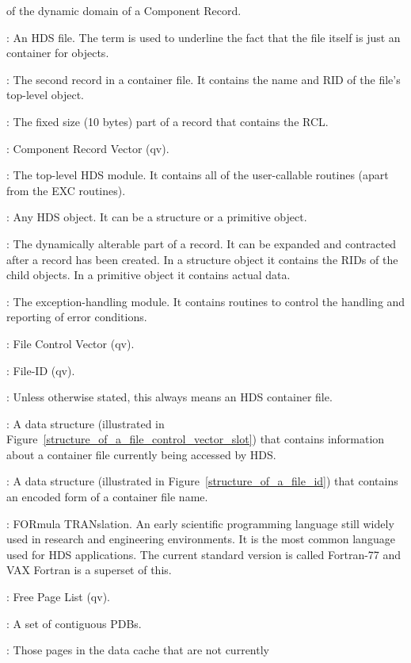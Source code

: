 \begin {description}
of the dynamic domain of a Component Record.
\item [Container File]: An HDS file. The term is used to underline the fact
that the file itself is just an container for objects.
\item [Container Record]: The second record in a container file. It contains
the name and RID of the file's top-level object.
\item [Control Domain]: The fixed size (10 bytes) part of a record that
contains the RCL.
\item [CRV]: Component Record Vector (qv).
\item [DAT]: The top-level HDS module. It contains all of the user-callable
routines (apart from the EXC routines).
\item [Data Object]: Any HDS object. It can be a structure or a primitive
object.
\item [Dynamic Domain]: The dynamically alterable part of a record. It can
be expanded and contracted after a record has been created. In a structure
object it contains the RIDs of the child objects. In a primitive object it
contains actual data.
\item [EXC]: The exception-handling module. It contains routines to control
the handling and reporting of error conditions.
\item [FCV]: File Control Vector (qv).
\item [FID]: File-ID (qv).
\item [File]: Unless otherwise stated, this always means an HDS container file.
\item [File Control Vector]: A data structure (illustrated in
Figure~\ref{structure_of_a_file_control_vector_slot}) that contains information
about a container file currently being accessed by HDS.
\item [File-ID]: A data structure (illustrated in
Figure~\ref{structure_of_a_file_id}) that contains an encoded form of a
container file name. 
\item [FORTRAN]: FORmula TRANslation. An early scientific programming language
still widely used in research and engineering environments. It is the most
common language used for HDS applications. The current standard version is
called Fortran-77 and VAX Fortran is a superset of this.
\item [FPL]: Free Page List (qv).
\item [Frame]: A set of contiguous PDBs.
\item [Free Page List]: Those pages in the data cache that are not currently

\end{description}
